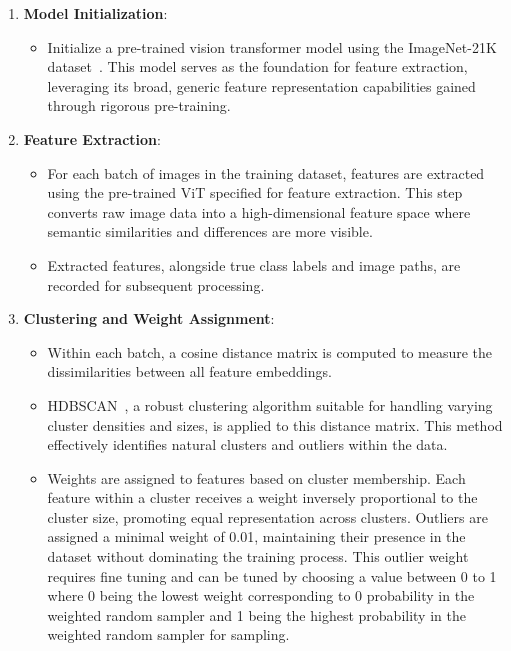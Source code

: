 \begin{enumerate}
    \item \textbf{Model Initialization}:
    \begin{itemize}
        \item Initialize a pre-trained vision transformer model using the ImageNet-21K dataset~\citep{Imagenet_21K_ridnik2021imagenet}. This model serves as the foundation for feature extraction, leveraging its broad, generic feature representation capabilities gained through rigorous pre-training.
    \end{itemize}

    \item \textbf{Feature Extraction}:
    \begin{itemize}
        \item For each batch of images in the training dataset, features are extracted using the pre-trained ViT specified for feature extraction. This step converts raw image data into a high-dimensional feature space where semantic similarities and differences are more visible.
        \item Extracted features, alongside true class labels and image paths, are recorded for subsequent processing.
    \end{itemize}

    \item \textbf{Clustering and Weight Assignment}:
    \begin{itemize}
        \item Within each batch, a cosine distance matrix is computed to measure the dissimilarities between all feature embeddings.
        \item HDBSCAN~\citep{HDBSCAN_algo_campello2013density}, a robust clustering algorithm suitable for handling varying cluster densities and sizes, is applied to this distance matrix. This method effectively identifies natural clusters and outliers within the data.
        \item Weights are assigned to features based on cluster membership. Each feature within a cluster receives a weight inversely proportional to the cluster size, promoting equal representation across clusters. Outliers are assigned a minimal weight of 0.01, maintaining their presence in the dataset without dominating the training process. This outlier weight requires fine tuning and can be tuned by choosing a value between 0 to 1 where 0 being the lowest weight corresponding to 0 probability in the weighted random sampler and 1 being the highest probability in the weighted random sampler for sampling.
    \end{itemize}


\end{enumerate}
